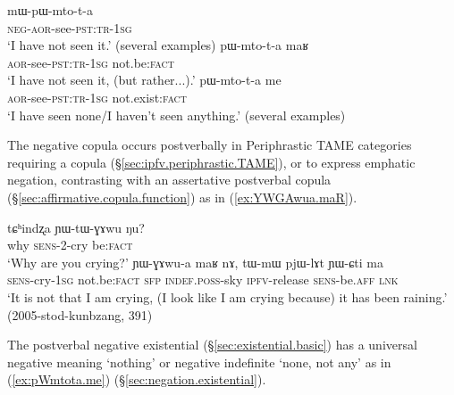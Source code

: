 \begin{exe}
	\ex  \label{ex:negation.3}
	\begin{xlist}
		\ex \label{ex:mWpWmtota}
		\gll mɯ-pɯ-mto-t-a \\
		\textsc{neg}-\textsc{aor}-see-\textsc{pst}:\textsc{tr}-\textsc{1sg} \\
		\glt `I have not seen it.' (several examples)
		\ex \label{ex:pWmtota.maR}
		\gll pɯ-mto-t-a maʁ\\
		\textsc{aor}-see-\textsc{pst}:\textsc{tr}-\textsc{1sg} not.be:\textsc{fact} \\
		\glt `I have not seen it, (but rather...).' 
		\ex \label{ex:pWmtota.me}
		\gll pɯ-mto-t-a me \\
		\textsc{aor}-see-\textsc{pst}:\textsc{tr}-\textsc{1sg} not.exist:\textsc{fact} \\
		\glt `I have seen none/I haven't seen anything.' (several examples)
	\end{xlist}
\end{exe}

The negative copula  occurs postverbally in Periphrastic TAME categories requiring a copula (§\ref{sec:ipfv.periphrastic.TAME}), or to express emphatic negation, contrasting with an assertative postverbal copula (§\ref{sec:affirmative.copula.function}) as in (\ref{ex:YWGAwua.maR}).

\begin{exe}
	\ex 
	\begin{xlist}
		\ex \label{ex:tChindzxa.YWtWGAwu}
		\gll tɕʰindʐa ɲɯ-tɯ-ɣɤwu ŋu? \\
		why \textsc{sens}-2-cry be:\textsc{fact} \\
		\glt `Why are you crying?' 
		\ex \label{ex:YWGAwua.maR}
		\gll ɲɯ-ɣɤwu-a maʁ nɤ, tɯ-mɯ pjɯ-lɤt ɲɯ-ɕti ma \\
		\textsc{sens}-cry-\textsc{1sg} not.be:\textsc{fact} \textsc{sfp} \textsc{indef}.\textsc{poss}-sky \textsc{ipfv}-release \textsc{sens}-be.\textsc{aff} \textsc{lnk} \\
		\glt `It is not that I am crying, (I look like I am crying because) it has been raining.' (2005-stod-kunbzang, 391)
	\end{xlist}
\end{exe}

The postverbal negative existential   (§\ref{sec:existential.basic}) has a universal negative meaning `nothing' or negative indefinite `none, not any' as in (\ref{ex:pWmtota.me}) (§\ref{sec:negation.existential}). 

